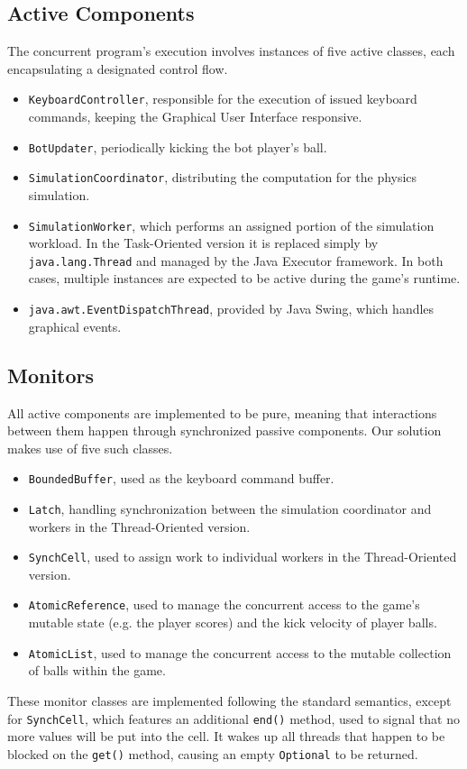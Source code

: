 \documentclass{scrartcl}
\begin{document}
\subsection{Active Components}
The concurrent program's execution involves instances of five active classes, each encapsulating a designated control flow.
\begin{itemize}
\item \texttt{KeyboardController}, responsible for the execution of issued keyboard commands, keeping the Graphical User Interface responsive.
\item \texttt{BotUpdater}, periodically kicking the bot player's ball.
\item \texttt{SimulationCoordinator}, distributing the computation for the  physics simulation.
\item \texttt{SimulationWorker}, which performs an assigned portion of the simulation workload. In the Task-Oriented version it is replaced simply by \texttt{java.lang.Thread} and managed by the Java Executor framework. In both cases, multiple instances are expected to be active during the game's runtime.
\item \texttt{java.awt.EventDispatchThread}, provided by Java Swing, which handles graphical events.
\end{itemize}

\subsection{Monitors}
All active components are implemented to be pure, meaning that interactions between them happen through synchronized passive components. Our solution makes use of five such classes.
\begin{itemize}
\item \texttt{BoundedBuffer}, used as the keyboard command buffer.
\item \texttt{Latch}, handling synchronization between the simulation coordinator and workers in the Thread-Oriented version.
\item \texttt{SynchCell}, used to assign work to individual workers in the Thread-Oriented version.
\item \texttt{AtomicReference}, used to manage the concurrent access to the game's mutable state (e.g. the player scores) and the kick velocity of player balls.
\item \texttt{AtomicList}, used to manage the concurrent access to the mutable collection of balls within the game.
\end{itemize}
These monitor classes are implemented following the standard semantics, except for \texttt{SynchCell}, which features an additional \texttt{end()} method, used to signal that no more values will be put into the cell. It wakes up all threads that happen to be blocked on the \texttt{get()} method, causing an empty \texttt{Optional} to be returned.
\end{document}
